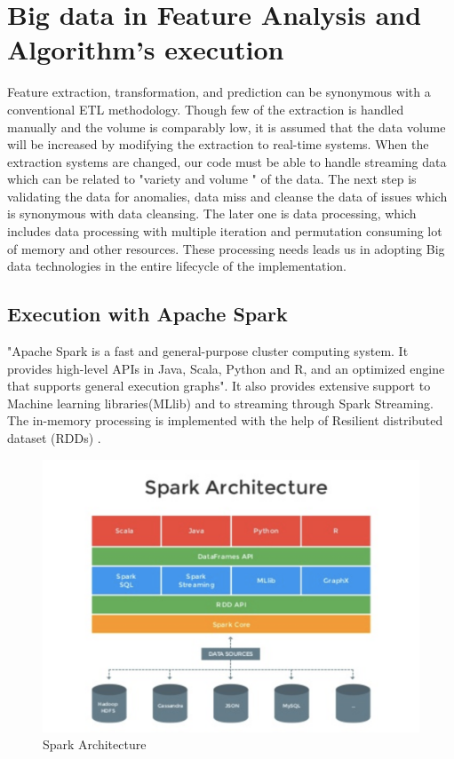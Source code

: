 \documentclass[sigconf]{acmart}
\begin{document}
\section{Big data in Feature Analysis and Algorithm's execution}
Feature extraction, transformation, and prediction can be synonymous with a conventional ETL methodology. Though few of the extraction is handled manually and the volume is comparably low, it is assumed that the data volume will be increased by modifying the extraction to real-time systems. When the extraction systems are changed, our code must be able to handle streaming data which can be related to "variety and volume " of the data. The next step is validating the data for anomalies, data miss and cleanse the data of issues which is synonymous with data cleansing. The later one is data processing, which includes data processing with multiple iteration and permutation consuming lot of memory and other resources. These processing needs leads us in adopting Big data technologies in the entire lifecycle of the implementation.

\subsection{Execution with Apache Spark}
"Apache Spark is a fast and general-purpose cluster computing system. It provides high-level APIs in Java, Scala, Python and R, and an optimized engine that supports general execution graphs". It also provides extensive support to Machine learning libraries(MLlib) and to streaming through Spark Streaming. The in-memory processing is implemented with the help of Resilient distributed dataset (RDDs) \cite{5:online}.

\begin{figure}[!ht]
  \centering\includegraphics[width=\columnwidth]{PROJECT/images/Sparkarchic.png}
  \caption{Spark Architecture}
\end{figure}
\end{document}
